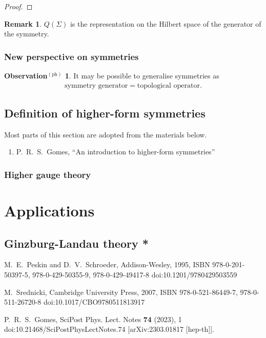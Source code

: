 \documentclass{article}
\theoremstyle{definition}
\newtheorem{remark}{Remark}[section]
\newtheorem{observationph}{Observation$^{(\mathrm{ph})}$}[section]
\numberwithin{equation}{section}
\begin{document}
\begin{proof}
\end{proof}

\begin{remark}
  $Q(\Sigma)$ is the representation on the Hilbert space of the generator of the symmetry.
\end{remark}

\subsubsection{New perspective on symmetries}
\begin{observationph}
  It may be possible to generalise symmetries as
  \begin{align}
    \text{symmetry generator} = \text{topological operator}.
  \end{align}
\end{observationph}
\subsection{Definition of higher-form symmetries}
Most parts of this section are adopted from the materials below.
\begin{enumerate}
\item [\cite{Gomes:2023ahz}] P.~R.~S.~Gomes,
``An introduction to higher-form symmetries''
\end{enumerate}

\subsubsection{Higher gauge theory}

\section{Applications}
\subsection{Ginzburg-Landau theory *}

\nocite{*}
% 
% 

\begin{thebibliography}{99}
M.~E.~Peskin and D.~V.~Schroeder,
Addison-Wesley, 1995,
ISBN 978-0-201-50397-5, 978-0-429-50355-9, 978-0-429-49417-8
doi:10.1201/9780429503559

M.~Srednicki,
Cambridge University Press, 2007,
ISBN 978-0-521-86449-7, 978-0-511-26720-8
doi:10.1017/CBO9780511813917

P.~R.~S.~Gomes,
SciPost Phys. Lect. Notes \textbf{74} (2023), 1
doi:10.21468/SciPostPhysLectNotes.74
[arXiv:2303.01817 [hep-th]].


\end{thebibliography}
\end{document}
